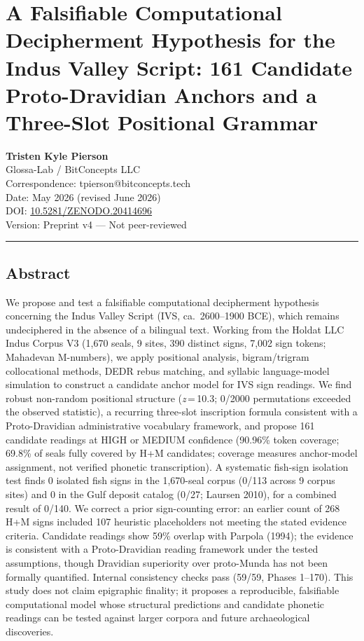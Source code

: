 \documentclass[
]{article}
\author{}
\date{}
\begin{document}
\section{A Falsifiable Computational Decipherment Hypothesis for the Indus Valley Script: 161 Candidate Proto-Dravidian Anchors and a Three-Slot Positional Grammar}\label{computational-decipherment-hypothesis-indus-valley-script}

\textbf{Tristen Kyle Pierson}\\
Glossa-Lab / BitConcepts LLC\\
Correspondence: tpierson@bitconcepts.tech\\
Date: May 2026 (revised June 2026)\\
DOI: \href{https://doi.org/10.5281/ZENODO.20414696}{10.5281/ZENODO.20414696}\\
Version: Preprint v4 --- Not peer-reviewed

\begin{center}\rule{0.5\linewidth}{0.5pt}\end{center}

\subsection{Abstract}\label{abstract}

We propose and test a falsifiable computational decipherment hypothesis
concerning the Indus Valley Script (IVS, ca.~2600--1900 BCE), which
remains undeciphered in the absence of a bilingual text. Working from the
Holdat LLC Indus Corpus V3 (1,670 seals, 9 sites, 390 distinct signs,
7,002 sign tokens; Mahadevan M-numbers), we apply positional analysis,
bigram/trigram collocational methods, DEDR rebus matching, and syllabic
language-model simulation to construct a candidate anchor model for IVS
sign readings. We find robust non-random positional structure
(\textit{z}\,=\,10.3; 0/2000 permutations exceeded the observed statistic),
a recurring three-slot inscription formula consistent with a
Proto-Dravidian administrative vocabulary framework, and propose 161
candidate readings at HIGH or MEDIUM confidence (90.96\% token coverage;
69.8\% of seals fully covered by H+M candidates; coverage measures
anchor-model assignment, not verified phonetic transcription). A
systematic fish-sign isolation test finds 0 isolated fish signs in the
1,670-seal corpus (0/113 across 9 corpus sites) and 0 in the Gulf deposit
catalog (0/27; Laursen 2010), for a combined result of 0/140.
We correct a prior sign-counting error: an earlier count of 268 H+M signs
included 107 heuristic placeholders not meeting the stated evidence
criteria. Candidate readings show 59\% overlap with Parpola (1994); the
evidence is consistent with a Proto-Dravidian reading framework under the
tested assumptions, though Dravidian superiority over proto-Munda has not
been formally quantified. Internal consistency checks pass (59/59, Phases
1--170). This study does not claim epigraphic finality; it proposes a
reproducible, falsifiable computational model whose structural predictions
and candidate phonetic readings can be tested against larger corpora and
future archaeological discoveries.
\end{document}
